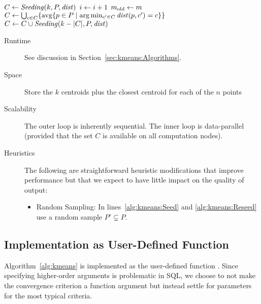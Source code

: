 \begin{algorithm} \label{alg:kmeans}
\begin{algorithmic}[1]
	\State $C \leftarrow \mathit{Seeding}(k, P, \mathit{dist})$ \label{alg:kmeans:Seed}
	\Repeat
		\State $i \leftarrow i + 1$
		\State $m_\text{old} \leftarrow m$
		\State $C \leftarrow \bigcup_{c \in C} \{ \operatorname{avg} \{p \in P \mid \arg\min_{c' \in C} \mathit{dist}(p, c') = c \} \}$ \label{alg:kmeans:MoveCentroids}
		\State $C \leftarrow C \cup \mathit{Seeding}(k - |C|, P, \mathit{dist})$ \label{alg:kmeans:Reseed}
	 \label{alg:kmeans:ConvergenceCond}
\end{algorithmic}
\end{algorithm}

\begin{description}
	\item[Runtime] See discussion in Section~\ref{sec:kmeans:Algorithms}.
	\item[Space] Store the $k$ centroids plus the closest centroid for each of the $n$ points
	\item[Scalability] The outer loop is inherently sequential. The inner loop is data-parallel (provided that the set $C$ is available on all computation nodes).
	\item[Heuristics] The following are straightforward heuristic modifications that improve performance but that we expect to have little impact on the quality of output:
		\begin{itemize}
			\item Random Sampling: In lines~\ref{alg:kmeans:Seed} and \ref{alg:kmeans:Reseed} use a random sample $P' \subsetneq P$.
		\end{itemize}
\end{description}

\subsection{Implementation as User-Defined Function}

Algorithm~\ref{alg:kmeans} is implemented as the user-defined function . Since specifying higher-order arguments is problematic in SQL, we choose to not make the convergence criterion a function argument but instead settle for parameters for the most typical criteria.

